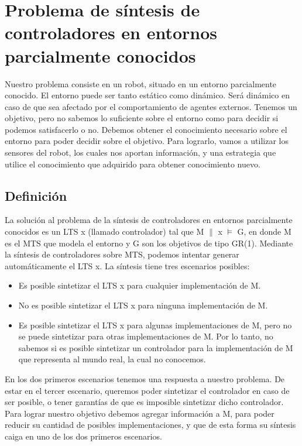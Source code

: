 \chapter{Problema de síntesis de controladores en entornos parcialmente conocidos}

Nuestro problema consiste en un robot, situado en un entorno parcialmente conocido.
El entorno puede ser tanto estático como dinámico. Será dinámico en caso de que sea afectado por el comportamiento
de agentes externos. Tenemos un objetivo, pero no sabemos lo suficiente sobre el entorno como para decidir si podemos
satisfacerlo o no. Debemos obtener el conocimiento necesario sobre el entorno para poder decidir sobre el objetivo.
Para lograrlo, vamos a utilizar los sensores del robot, los cuales nos aportan información, y una estrategia que
utilice el conocimiento que adquirido para obtener conocimiento nuevo.

\section{Definición}

La solución al problema de la síntesis de controladores en entornos parcialmente conocidos es un LTS x (llamado controlador) tal que 
M $\parallel$ x $\models$ G, en donde M es el MTS que modela el entorno y G son los objetivos de tipo GR(1). Mediante la 
síntesis de controladores sobre MTS, podemos intentar generar automáticamente el LTS x. La síntesis tiene tres escenarios posibles:

\begin{itemize}

\item
Es posible sintetizar el LTS x para cualquier implementación de M.

\item
No es posible sintetizar el LTS x para ninguna implementación de M.

\item
Es posible sintetizar el LTS x para algunas implementaciones de M, pero no se puede sintetizar para otras implementaciones de M.
Por lo tanto, no sabemos si es posible sintetizar un controlador para la implementación de M que representa al mundo real, la cual no conocemos.

\end{itemize}

\vspace{\baselineskip}
En los dos primeros escenarios tenemos una respuesta a nuestro problema. De estar en el tercer escenario, queremos poder sintetizar
el controlador en caso de ser posible, o tener garantías de que es imposible sintetizar dicho controlador. Para lograr nuestro objetivo
debemos agregar información a M, para poder reducir su cantidad de posibles implementaciones, y que de esta forma su síntesis caiga
en uno de los dos primeros escenarios.

